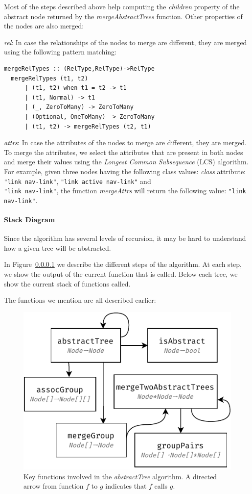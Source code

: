 \documentclass[sigconf,authordraft]{acmart}
\theoremstyle{definition}
\begin{document}
Most of the steps described above help computing the \emph{children} property of the abstract node returned by the \emph{mergeAbstractTrees} function.
Other properties of the nodes are also merged: 
\begin{compactdesc}
\item[\emph{rel}:] In case the relationships of the nodes to merge are different, they are merged using the following pattern matching:
\begin{lstlisting}[basicstyle=\small]
  mergeRelTypes :: (RelType,RelType)->RelType
  mergeRelTypes (t1, t2)
      | (t1, t2) when t1 = t2 -> t1
      | (t1, Normal) -> t1
      | (_, ZeroToMany) -> ZeroToMany
      | (Optional, OneToMany) -> ZeroToMany
      | (t1, t2) -> mergeRelTypes (t2, t1)
\end{lstlisting}

\item[\emph{attrs}:] In case the attributes of the nodes to merge are different, they are merged.
To merge the attributes, we select the attributes that are present in both nodes and merge their values using the \emph{Longest Common Subsequence} (LCS) algorithm.
For example, given three nodes having the following class values:  \emph{class} attribute: \lstinline{"link nav-link"}, \lstinline{"link active nav-link"} and \\\lstinline{"link nav-link"}, the function \emph{mergeAttrs}  will return the following value: \lstinline{"link nav-link"}.
\end{compactdesc}

\paragraph{Stack Diagram}
Since the algorithm has several levels of recursion, it may be hard to understand how a given tree will be abstracted. 

In Figure~\ref{} we describe the different steps of the algorithm.
At each step, we show the output of the current function that is called.
Below each tree, we show the current stack of functions called.

The functions we mention are all described earlier:
\begin{figure}[]
  \centering
  \includegraphics[width=0.7\linewidth]{explanations/functions_relations}
  \caption{Key functions involved in the \emph{abstractTree} algorithm. A directed arrow from function $f$ to $g$ indicates that $f$ calls $g$.}
  \label{fig:functions_relations}
\end{figure}
\end{document}
